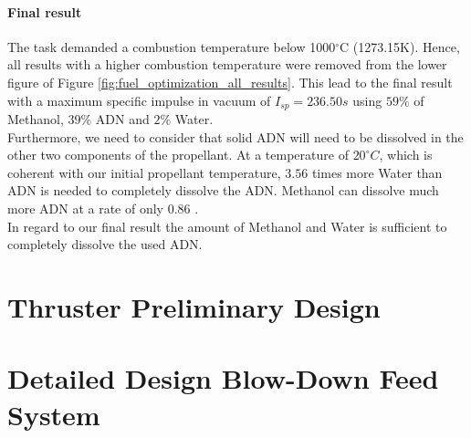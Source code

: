 \documentclass[12pt]{article}
\begin{document}
\paragraph{Final result}
The task demanded a combustion temperature below 1000$^\circ$C (1273.15K). Hence, all results with a higher combustion temperature were removed from the lower figure of Figure \ref{fig:fuel_optimization_all_results}. This lead to the final result with a maximum specific impulse in vacuum of $I_{sp}=236.50s$ using $59\%$ of Methanol, $39\%$ ADN and $2\%$ Water.\\

Furthermore, we need to consider that solid ADN will need to be dissolved in the other two components of the propellant. At a temperature of $20^\circ C$, which is coherent with our initial propellant temperature, $3.56$ times more Water than ADN is needed to completely dissolve the ADN. Methanol can dissolve much more ADN at a rate of only $0.86$ \cite{Larsson2011}.\\

In regard to our final result the amount of Methanol and Water is sufficient to completely dissolve the used ADN.

\section{Thruster Preliminary Design}

\section{Detailed Design Blow-Down Feed System}
\end{document}
